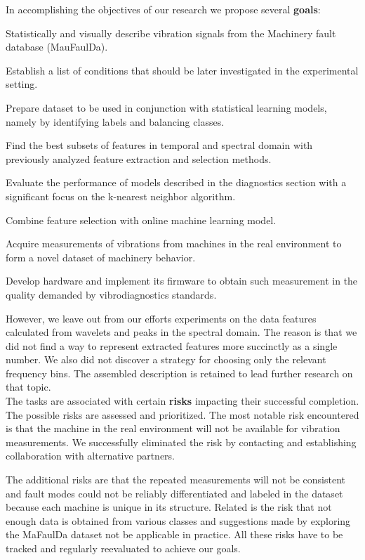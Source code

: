 \noindent In accomplishing the objectives of our research we propose several \textbf{goals}:
\begin{todolist}
    \itemsep0pt
	\item Statistically and visually describe vibration signals from the Machinery fault database (MauFaulDa).
	\item Establish a list of conditions that should be later investigated in the experimental setting.
	\item Prepare dataset to be used in conjunction with statistical learning models, namely by identifying labels and balancing classes.
	\item Find the best subsets of features in temporal and spectral domain with previously analyzed feature extraction and selection methods.
	\item Evaluate the performance of models described in the diagnostics section with a significant focus on the k-nearest neighbor algorithm.
	\item Combine feature selection with online machine learning model.
	\item Acquire measurements of vibrations from machines in the real environment to form a novel dataset of machinery behavior.
	\item Develop hardware and implement its firmware to obtain such measurement in the quality demanded by vibrodiagnostics standards.
\end{todolist}

However, we leave out from our efforts experiments on the data features calculated from wavelets and peaks in the spectral domain. The reason is that we did not find a way to represent extracted features more succinctly as a single number. We also did not discover a strategy for choosing only the relevant frequency bins. The assembled description is retained to lead further research on that topic. \\

The tasks are associated with certain \textbf{risks} impacting their successful completion. The possible risks are assessed and prioritized. The most notable risk encountered is that the machine in the real environment will not be available for vibration measurements. We successfully eliminated the risk by contacting and establishing collaboration with alternative partners. 

The additional risks are that the repeated measurements will not be consistent and fault modes could not be reliably differentiated and labeled in the dataset because each machine is unique in its structure. Related is the risk that not enough data is obtained from various classes and suggestions made by exploring the MaFaulDa dataset not be applicable in practice. All these risks have to be tracked and regularly reevaluated to achieve our goals.


